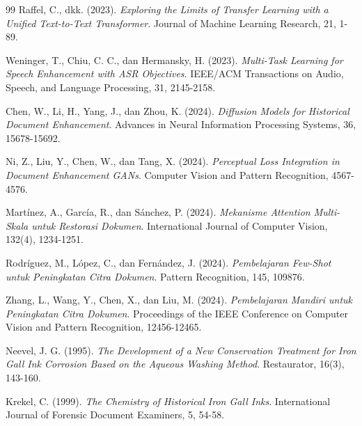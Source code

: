 \documentclass[12pt,a4paper]{book}
\begin{document}
\begin{thebibliography}{99}
Raffel, C., dkk. (2023).
\textit{Exploring the Limits of Transfer Learning with a Unified Text-to-Text Transformer}.
Journal of Machine Learning Research, 21, 1-89.


Weninger, T., Chiu, C. C., dan Hermansky, H. (2023).
\textit{Multi-Task Learning for Speech Enhancement with ASR Objectives}.
IEEE/ACM Transactions on Audio, Speech, and Language Processing, 31, 2145-2158.


Chen, W., Li, H., Yang, J., dan Zhou, K. (2024).
\textit{Diffusion Models for Historical Document Enhancement}.
Advances in Neural Information Processing Systems, 36, 15678-15692.

Ni, Z., Liu, Y., Chen, W., dan Tang, X. (2024).
\textit{Perceptual Loss Integration in Document Enhancement GANs}.
Computer Vision and Pattern Recognition, 4567-4576.

Martínez, A., García, R., dan Sánchez, P. (2024).
\textit{Mekanisme Attention Multi-Skala untuk Restorasi Dokumen}.
International Journal of Computer Vision, 132(4), 1234-1251.

Rodríguez, M., López, C., dan Fernández, J. (2024).
\textit{Pembelajaran Few-Shot untuk Peningkatan Citra Dokumen}.
Pattern Recognition, 145, 109876.

Zhang, L., Wang, Y., Chen, X., dan Liu, M. (2024).
\textit{Pembelajaran Mandiri untuk Peningkatan Citra Dokumen}.
Proceedings of the IEEE Conference on Computer Vision and Pattern Recognition, 12456-12465.


Neevel, J. G. (1995).
\textit{The Development of a New Conservation Treatment for Iron Gall Ink Corrosion Based on the Aqueous Washing Method}.
Restaurator, 16(3), 143-160.

Krekel, C. (1999).
\textit{The Chemistry of Historical Iron Gall Inks}.
International Journal of Forensic Document Examiners, 5, 54-58.


\end{thebibliography}
\end{document}
